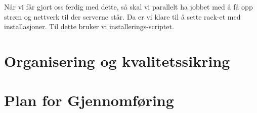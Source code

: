 \documentclass[12pt,a4paper]{article}
\begin{document}
Når vi får gjort oss ferdig med dette, så skal vi parallelt ha jobbet med å få opp strøm og nettverk til der serverne står. Da er vi klare
til å sette rack-et med installasjoner. Til dette bruker vi installerings-scriptet. 

\section{Organisering og kvalitetssikring}

\section{Plan for Gjennomføring}
\end{document}
